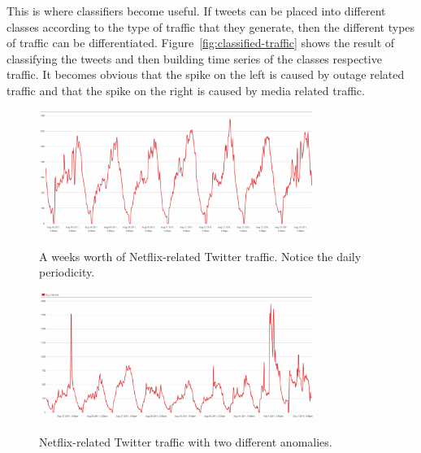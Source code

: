 \documentclass[12pt]{ucthesis}
\newcommand{\captionfonts}{\small\bf\ssp}
\begin{document}
This is where classifiers become useful. If tweets can be placed into different classes according to the type of traffic that they
generate, then the different types of traffic can be differentiated. Figure~\ref{fig:classified-traffic} shows the result of classifying
the tweets and then building time series of the classes respective traffic. It becomes obvious that the spike on the left is caused by
outage related traffic and that the spike on the right is caused by media related traffic.

\begin{figure}
   \begin{center}
      \includegraphics[width=0.8\textwidth]{images/Normal_Traffic.eps}
      \captionfonts
      \caption[Normal Traffic]{A weeks worth of Netflix-related Twitter traffic. Notice the daily periodicity.}
      \label{fig:normal-traffic}
   \end{center}
\end{figure}

\begin{figure}
   \begin{center}
      \includegraphics[width=0.8\textwidth]{images/Anomalous_Traffic.eps}
      \captionfonts
      \caption[Anomalous Traffic]{Netflix-related Twitter traffic with two different anomalies.}
      \label{fig:anomalous-traffic}
   \end{center}
\end{figure}
\end{document}
